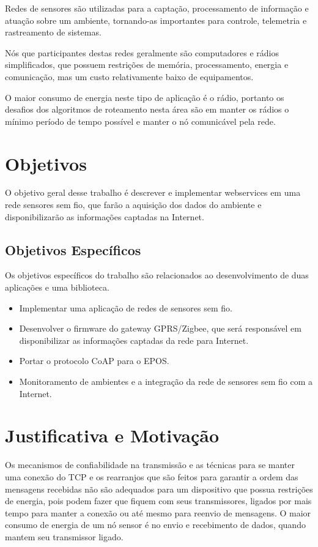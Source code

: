 Redes de sensores s\~ao utilizadas para a capta\c{c}\~ao, processamento de informa\c{c}\~ao e atua\c{c}\~ao sobre um ambiente, tornando-as importantes para controle, telemetria e rastreamento de sistemas.

N\'os que participantes destas redes geralmente s\~ao computadores e r\'adios simplificados, que possuem restri\c{c}\~oes de mem\'oria, processamento, energia e comunica\c{c}\~ao, mas um custo relativamente baixo de equipamentos.

O maior consumo de energia neste tipo de aplica\c{c}\~ao \'e o r\'adio, portanto os desafios dos algoritmos de roteamento nesta \'area s\~ao em manter os r\'adios o m\'inimo per\'iodo de tempo poss\'ivel e manter o n\'o comunic\'avel pela rede.

\section{Objetivos}

O objetivo geral desse trabalho \'e descrever e implementar webservices em uma rede sensores sem fio, que far\~ao a aquisi\c{c}\~ao dos dados do ambiente e disponibilizar\~ao as informa\c{c}\~oes captadas na Internet.


\subsection{Objetivos Espec\'ificos}
Os objetivos espec\'ificos do trabalho s\~ao relacionados ao desenvolvimento de duas aplica\c{c}\~oes e uma biblioteca.

\begin{itemize}
    \item Implementar uma aplica\c{c}\~ao de redes de sensores sem fio.
    \item Desenvolver o firmware do  gateway GPRS/Zigbee, que ser\'a respons\'avel em disponibilizar as informa\c{c}\~oes captadas da rede para Internet.
    \item Portar o protocolo CoAP para o EPOS.
    \item Monitoramento de ambientes e a integra\c{c}\~ao da rede de sensores sem fio com a Internet.
\end{itemize}
        

\section{Justificativa e Motiva\c{c}\~ao}

Os mecanismos de confiabilidade na transmiss\~ao e as t\'ecnicas para se manter uma conex\~ao do TCP e os rearranjos que s\~ao feitos para garantir a ordem das mensagens recebidas n\~ao s\~ao adequados para um dispositivo que possua restri\c{c}\~oes de energia, pois podem fazer que fiquem com seus transmissores, ligados por mais tempo para manter a conex\~ao ou at\'e mesmo para reenvio de mensagens. O maior consumo de energia de um n\'o sensor \'e no envio e recebimento de dados, quando mantem seu transmissor ligado.

